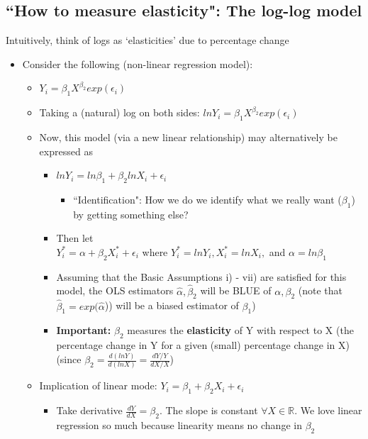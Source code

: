 \documentclass[10pt, oneside]{article}
\newcommand{\R}{\mathbb{R}}
\begin{document}
\subsection{``How to measure elasticity": The log-log model}
Intuitively, think of logs as `elasticities' due to percentage change
\begin{itemize}
    \item Consider the following (non-linear regression model):
    \begin{itemize}
        \item $Y_i = \beta_1 X ^{\beta_2} exp(\epsilon_i)$
        \item Taking a (natural) log on both sides: $ln Y_i = \beta_1 X^{\beta_2} exp(\epsilon_i)$
        \item Now, this model (via a new linear relationship) may alternatively be expressed as 
        \begin{itemize}
            \item $ln Y_i = ln\beta_1 + \beta_2 lnX_i + \epsilon_i$
            \begin{itemize}
                \item ``Identification": How we do we identify what we really want ($\beta_1$) by getting something else?
            \end{itemize}
            \item Then let \\ $Y_i ^* = \alpha + \beta_2 X_i ^* + \epsilon_i$ where $Y_i ^* = lnY_i , X_i ^* = lnX_i,$ and $\alpha = ln \beta_1$
            \item Assuming that the Basic Assumptions i) - vii) are satisfied for this model, the OLS estimators $\hat \alpha, \hat \beta_2$ will be BLUE of $\alpha, \beta_2$ (note that $\hat \beta_1 = exp(\hat \alpha$)) will be a biased estimator of $\beta_1$)
            \item \textbf{Important:} $\beta_2$ measures the \textbf{elasticity} of Y with respect to X (the percentage change in Y for a given (small) percentage change in X) (since $\beta_2 = \frac{d(lnY)}{d(lnX)} = \frac{dY/Y}{dX/X}$)
        \end{itemize}
        \item Implication of linear mode: $Y_i = \beta_1 + \beta_2 X_i + \epsilon_i$
        \begin{itemize}
            \item Take derivative $\frac{dY}{dX} = \beta_2$. The slope is constant $\forall X \in \R$. We love linear regression so much because linearity means no change in $\beta_2$

\end{itemize}
\end{itemize}
\end{itemize}
\end{document}
